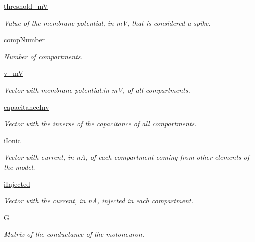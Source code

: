 \begin{DoxyCompactItemize}
\hyperlink{class_motor_unit_1_1_motor_unit_affbd0b90f1dce6a0f929775e54f8c212}{threshold\-\_\-m\-V}
\begin{DoxyCompactList}\small\item\em Value of the membrane potential, in m\-V, that is considered a spike. \end{DoxyCompactList}\item 
\hyperlink{class_motor_unit_1_1_motor_unit_afe7281fb12c41102980b6b48d5a49713}{comp\-Number}
\begin{DoxyCompactList}\small\item\em Number of compartments. \end{DoxyCompactList}\item 
\hyperlink{class_motor_unit_1_1_motor_unit_aa8968f89250895ae2ae572e9106709f2}{v\-\_\-m\-V}
\begin{DoxyCompactList}\small\item\em Vector with membrane potential,in m\-V, of all compartments. \end{DoxyCompactList}\item 
\hyperlink{class_motor_unit_1_1_motor_unit_a0cf2afb5bd12374db56b9d9a5a1671e6}{capacitance\-Inv}
\begin{DoxyCompactList}\small\item\em Vector with the inverse of the capacitance of all compartments. \end{DoxyCompactList}\item 
\hyperlink{class_motor_unit_1_1_motor_unit_a0541858216e7d01582312f9a7a99d595}{i\-Ionic}
\begin{DoxyCompactList}\small\item\em Vector with current, in n\-A, of each compartment coming from other elements of the model. \end{DoxyCompactList}\item 
\hyperlink{class_motor_unit_1_1_motor_unit_a06045eca379d38892670a491dbac0829}{i\-Injected}
\begin{DoxyCompactList}\small\item\em Vector with the current, in n\-A, injected in each compartment. \end{DoxyCompactList}\item 
\hyperlink{class_motor_unit_1_1_motor_unit_a9b9f157ab92b47470ca7ec6bd3473dd3}{G}
\begin{DoxyCompactList}\small\item\em Matrix of the conductance of the motoneuron. \end{DoxyCompactList}\item 

\end{DoxyCompactItemize}
